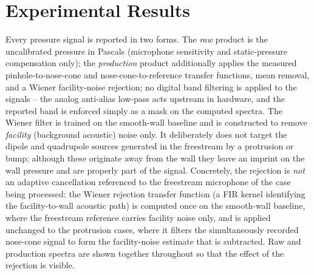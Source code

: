 %
\section{Experimental Results}\label{sec:results}

Every pressure signal is reported in two forms. The \emph{raw} product is the uncalibrated pressure in Pascals (microphone sensitivity and static-pressure compensation only); the \emph{production} product additionally applies the measured pinhole-to-nose-cone and nose-cone-to-reference transfer functions, mean removal, and a Wiener facility-noise rejection; no digital band filtering is applied to the signals -- the analog anti-alias low-pass acts upstream in hardware, and the reported band is enforced simply as a mask on the computed spectra. The Wiener filter is trained on the smooth-wall baseline and is constructed to remove \emph{facility} (background acoustic) noise only. It deliberately does not target the dipole and quadrupole sources generated in the freestream by a protrusion or bump; although these originate away from the wall they leave an imprint on the wall pressure and are properly part of the signal. Concretely, the rejection is \emph{not} an adaptive cancellation referenced to the freestream microphone of the case being processed: the Wiener rejection transfer function (a FIR kernel identifying the facility-to-wall acoustic path) is computed once on the smooth-wall baseline, where the freestream reference carries facility noise only, and is applied unchanged to the protrusion cases, where it filters the simultaneously recorded nose-cone signal to form the facility-noise estimate that is subtracted. Raw and production spectra are shown together throughout so that the effect of the rejection is visible.

